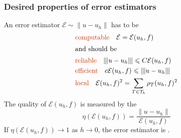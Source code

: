 \begin{frame}
  \frametitle{Desired properties of error estimators}
  An error estimator $\mathcal{E} \sim \| u - u_h \|$ has to be
      \begin{align*}
        &\text{\colemph{computable}} \quad  \mathcal{E} = \mathcal{E}(u_h,f)
        \\
        \intertext{and should be}
        &\text{\colemph{reliable}} \quad\tn u - u_{h} \tn \leqslant
        C \mcE(u_{h},f) \\
        &\text{\colemph{efficient}} \quad c \mcE(u_{h},f) \leqslant
        \tn u - u_{h} \tn  \\
        &\text{\colemph{local}} \quad\mcE(u_{h},f)^2 = \sum_{T\in
        \mesh_h} \rho_{T}(u_{h},f)^2  
      \end{align*}
  The quality of $\mathcal{E}(u_h, f)$ is measured by the
\[
  \eta(\mathcal{E}(u_h,f)) = \dfrac{\| u - u_h \|}{\mathcal{E}(u_h,f)}
\]
  If $\eta(\mathcal{E}(u_h,f)) \to 1$ as $h \to 0$, the error
  estimator is .
\end{frame}

